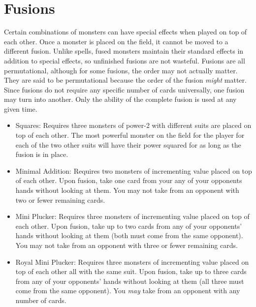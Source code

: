 \documentclass[letterpaper, reqno, 11pt]{article}
\begin{document}
\section*{Fusions}
\indent Certain combinations of monsters can have special effects when played on top of each other. Once a monster is placed on the field, it cannot be moved to a different fusion. Unlike spells, fused monsters maintain their standard effects in addition to special effects, so unfinished fusions are not wasteful. Fusions are all permutational, although for some fusions, the order may not actually matter. They are said to be permutational because the order of the fusion \textit{might} matter. Since fusions do not require any specific number of cards universally, one fusion may turn into another. Only the ability of the complete fusion is used at any given time.
\begin{itemize}
\item Squares: Requires three monsters of power-2 with different suits are placed on top of each other. The most powerful monster on the field for the player for each of the two other suits will have their power squared for as long as the fusion is in place.
\item Minimal Addition: Requires two monsters of incrementing value placed on top of each other. Upon fusion, take one card from your any of your opponents hands without looking at them. You may not take from an opponent with two or fewer remaining cards.
\item Mini Plucker: Requires three monsters of incrementing value placed on top of each other. Upon fusion, take up to two cards from any of your opponents' hands without looking at them (both must come from the same opponent). You may not take from an opponent with three or fewer remaining cards.
\item Royal Mini Plucker: Requires three monsters of incrementing value placed on top of each other all with the same suit. Upon fusion, take up to three cards from any of your opponents' hands without  looking at them (all three must come from the same opponent). You \textit{may} take from an opponent with any number of cards.
\end{itemize}
\end{document}

